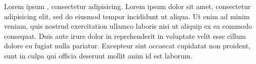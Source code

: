 \documentclass{article}
\begin{document}
Lorem ipsum , consectetur adipisicing. Lorem
ipsum dolor sit amet, consectetur adipisicing elit, sed do eiusmod
tempor incididunt ut  aliqua. Ut enim
ad minim veniam, quis nostrud exercitation ullamco laboris nisi ut
aliquip ex ea commodo consequat. Duis aute irure dolor in reprehenderit
in voluptate velit esse cillum dolore eu fugiat nulla pariatur.
Excepteur sint occaecat cupidatat non proident, sunt in culpa qui
officia deserunt mollit anim id est laborum.
\end{document}
